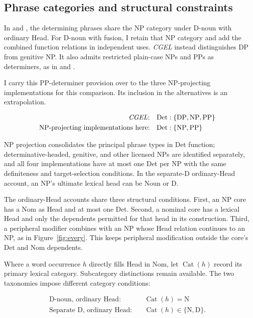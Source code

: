 \documentclass[12pt]{article}
\begin{document}
\subsection{Phrase categories and structural constraints}\label{sec:det-uniform}

In  and , the determining phrases share the NP category under D-noun with ordinary Head. For D-noun with fusion, I retain that NP category and add the combined function relations in independent uses. \textit{CGEL} instead distinguishes DP from genitive NP. It also admits restricted plain-case NPs and PPs as determiners, as in  and  \citep[Ch.~5, §4]{huddleston2002}.

I carry this PP-determiner provision over to the three NP-projecting implementations for this comparison. Its inclusion in the alternatives is an extrapolation.

\[
\begin{aligned}
\text{\textit{CGEL}:} &\quad \mathrm{Det}:\{\mathrm{DP},\mathrm{NP},\mathrm{PP}\} \\
\text{NP-projecting implementations here:} &\quad \mathrm{Det}:\{\mathrm{NP},\mathrm{PP}\}
\end{aligned}
\]

NP projection consolidates the principal phrase types in Det function; determinative-headed, genitive, and other licensed NPs are identified separately, and all four implementations have at most one Det per NP with the same definiteness and target-selection conditions. In the separate-D ordinary-Head account, an NP's ultimate lexical head can be Noun or D.

The ordinary-Head accounts share three structural conditions. First, an NP core has a Nom as Head and at most one Det. Second, a nominal core has a lexical Head and only the dependents permitted for that head in its construction. Third, a peripheral modifier combines with an NP whose Head relation continues to an NP, as in Figure~\ref{fig:every}. This keeps peripheral modification outside the core's Det and Nom dependents.

Where a word occurrence $h$ directly fills Head in Nom, let $\operatorname{Cat}(h)$ record its primary lexical category. Subcategory distinctions remain available. The two taxonomies impose different category conditions:

\[
\begin{aligned}
\text{D-noun, ordinary Head:} &\quad \operatorname{Cat}(h)=\mathrm{N} \\
\text{Separate D, ordinary Head:} &\quad \operatorname{Cat}(h)\in\{\mathrm{N},\mathrm{D}\}.
\end{aligned}
\]
\end{document}
